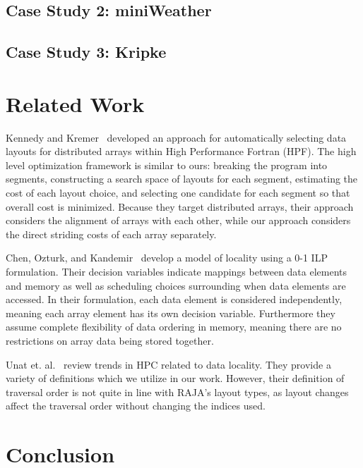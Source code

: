 \documentclass[sigconf, table]{acmart}
\begin{document}
\subsection{Case Study 2: miniWeather}

\subsection{Case Study 3: Kripke}

\section{Related Work}

Kennedy and Kremer~\cite{kennedy1995automatic} developed an approach for automatically selecting data layouts for distributed arrays within High Performance Fortran (HPF). 
The high level optimization framework is similar to ours: breaking the program into segments, constructing a search space of layouts for each segment, estimating the cost of each layout choice, and selecting one candidate for each segment so that overall cost is minimized. 
Because they target distributed arrays, their approach considers the alignment of arrays with each other, while our approach considers the direct striding costs of each array separately. 

Chen, Ozturk, and Kandemir~\cite{Chen2004ilp} develop a model of locality using a 0-1 ILP formulation. 
Their decision variables indicate mappings between data elements and memory as well as scheduling choices surrounding when data elements are accessed. 
In their formulation, each data element is considered independently, meaning each array element has its own decision variable. 
Furthermore they assume complete flexibility of data ordering in memory, meaning there are no restrictions on array data being stored together.

Unat et. al.~\cite{unat2017trends} review trends in HPC related to data locality. They provide a variety of definitions which we utilize in our work. However, their definition of traversal order is not quite in line with RAJA's layout types, as layout changes affect the traversal order without changing the indices used. 
\section{Conclusion}




\end{document}
